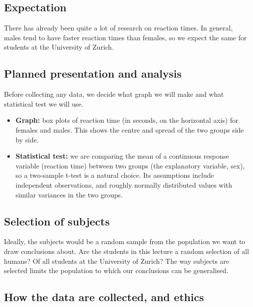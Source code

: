 \documentclass[
  letterpaper,
  8pt,
  a4paper]{book}
\providecommand{\tightlist}{%
  \setlength{\itemsep}{0pt}\setlength{\parskip}{0pt}}
\begin{document}
\subsection*{Expectation}\label{expectation}

There has already been quite a lot of research on reaction times. In
general, males tend to have faster reaction times than females, so we
expect the same for students at the University of Zurich.

\subsection*{Planned presentation and
analysis}\label{planned-presentation-and-analysis}

Before collecting any data, we decide what graph we will make and what
statistical test we will use.

\begin{itemize}
\tightlist
\item
  \textbf{Graph:} box plots of reaction time (in seconds, on the
  horizontal axis) for females and males. This shows the centre and
  spread of the two groups side by side.
\item
  \textbf{Statistical test:} we are comparing the mean of a continuous
  response variable (reaction time) between two groups (the explanatory
  variable, sex), so a two-sample t-test is a natural choice. Its
  assumptions include independent observations, and roughly normally
  distributed values with similar variances in the two groups.
\end{itemize}

\subsection*{Selection of subjects}\label{selection-of-subjects}

Ideally, the subjects would be a random sample from the population we
want to draw conclusions about. Are the students in this lecture a
random selection of all humans? Of all students at the University of
Zurich? The way subjects are selected limits the population to which our
conclusions can be generalised.

\subsection*{How the data are collected, and
ethics}\label{how-the-data-are-collected-and-ethics}
\end{document}
